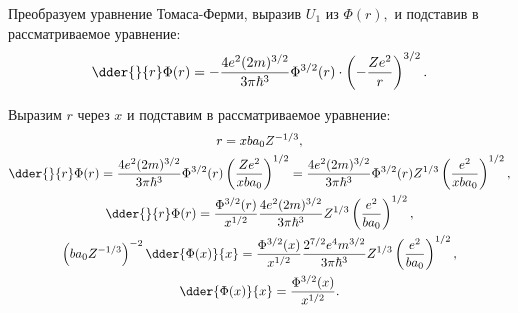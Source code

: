 Преобразуем уравнение Томаса-Ферми, выразив \( U_1 \) из \( \Phi(r), \) и
подставив в рассматриваемое уравнение:
\[
  \dder{}{r}\Phi(r)= -\frac{4e^2(2m)^{3 / 2}}{3\pi\hbar^3} \Phi^{3 / 2}(r)
    \cdot \left( -\frac{Ze^2}{r} \right)^{3 / 2}.
\]

Выразим \( r \) через \( x \) и подставим в рассматриваемое уравнение:
\begin{gather*}
  r = xba_0Z^{-1 / 3}, \\
  \dder{}{r} \Phi(r) = \frac{4e^2(2m)^{3 / 2}}{3\pi\hbar^3} \Phi^{3 / 2}(r)
    \left( \frac{Ze^2}{xba_0} \right)^{1 / 2} =
    \frac{4e^2(2m)^{3 / 2}}{3\pi\hbar^3} \Phi^{3 / 2}(r) Z^{1 / 3}
    \left( \frac{e^2}{xba_0} \right)^{1 / 2}, \\
  \dder{}{r}\Phi(r) = \frac{\Phi^{3 / 2}(r)}{x^{1 / 2}} \frac{4e^2(2m)^{3 / 2}}
    {3\pi\hbar^3} Z^{1 / 3} \left( \frac{e^2}{ba_0} \right)^{1 / 2}, \\
  \left( ba_0Z^{-1 / 3} \right)^{-2} \dder{\Phi(x)}{x} =
    \frac{\Phi^{3 / 2}(x)}{x^{1 / 2}} \frac{2^{7 / 2} e^4 m^{3 / 2}}
    {3\pi\hbar^3} Z^{1 / 3} \left( \frac{e^2}{ba_0} \right)^{1 / 2}, \\ 
  \dder{\Phi(x)}{x} = \frac{\Phi^{3 / 2}(x)}{x^{1 / 2}}.
\end{gather*}
